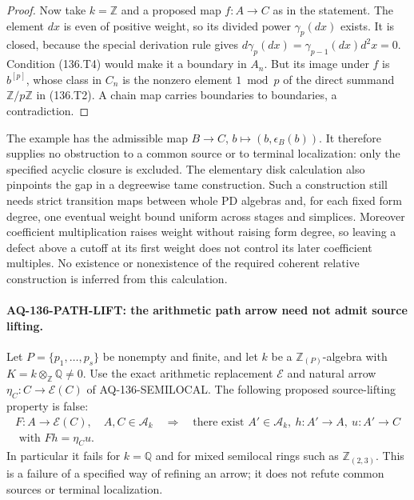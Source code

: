 \begin{proof}
Now take $k=\mathbb Z$ and a proposed map $f:A\to C$ as in
the statement. The element $dx$ is even of positive weight,
so its divided power $\gamma_p(dx)$ exists. It is closed,
because the special derivation rule gives
$d\gamma_p(dx)=\gamma_{p-1}(dx)d^2x=0$.
Condition (136.T4) would make it a boundary in $A_n$.
But its image under $f$ is $b^{[p]}$, whose class in $C_n$
is the nonzero element $1\bmod p$ of the direct summand
$\mathbb Z/p\mathbb Z$ in (136.T2). A chain map carries
boundaries to boundaries, a contradiction.
\end{proof}

The example has the admissible map
$B\to C$, $b\mapsto(b,\epsilon_B(b))$.
It therefore supplies no obstruction to a common source
or to terminal localization: only the specified acyclic
closure is excluded. The elementary disk calculation also
pinpoints the gap in a degreewise tame construction. Such a
construction still needs strict transition maps between whole
PD algebras and, for each fixed form degree, one eventual weight
bound uniform across stages and simplices. Moreover coefficient
multiplication raises weight without raising form degree, so
leaving a defect above a cutoff at its first weight does not
control its later coefficient multiples. No existence or
nonexistence of the required coherent relative construction
is inferred from this calculation.

\paragraph{AQ-136-PATH-LIFT: the arithmetic path arrow need not admit source lifting.}
Let $P=\{p_1,\ldots,p_s\}$ be nonempty and finite, and let $k$
be a $\mathbb Z_{(P)}$-algebra with
$K=k\otimes_{\mathbb Z}\mathbb Q\ne0$.
Use the exact arithmetic replacement $\mathcal E$ and natural
arrow $\eta_C:C\to\mathcal E(C)$ of AQ-136-SEMILOCAL.
The following proposed source-lifting property is false:
\[
 \begin{gathered}
 F:A\longrightarrow\mathcal E(C),\quad A,C\in\mathcal A_k
 \quad\Longrightarrow\quad
 \text{there exist }A'\in\mathcal A_k,\ h:A'\to A,\ u:A'\to C\\
 \text{ with }Fh=\eta_Cu.
 \end{gathered}                                             \tag{136.PL1}
\]
In particular it fails for $k=\mathbb Q$ and for mixed semilocal
rings such as $\mathbb Z_{(2,3)}$.
This is a failure of a specified way of refining an arrow;
it does not refute common sources or terminal localization.

